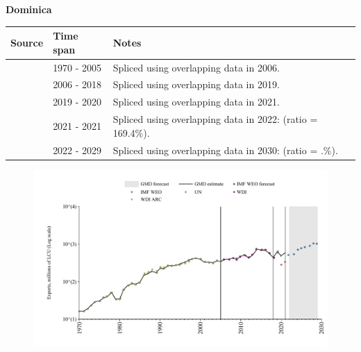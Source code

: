 \documentclass[12pt,a4paper,landscape]{article}
\begin{document}
\begin{adjustbox}{max totalsize={\paperwidth}{\paperheight},center}
\begin{minipage}[t][\textheight][t]{\textwidth}
\vspace*{0.5cm}
{}
\begin{center}
{\Large\bfseries Dominica}
\end{center}
\vspace{0.5cm}
\begin{table}[H]
\centering
\small
\begin{tabular}{|l|l|l|}
\hline
\textbf{Source} & \textbf{Time span} & \textbf{Notes} \\
\hline
\rowcolor{white}\cite{UN}& 1970 - 2005 &Spliced using overlapping data in 2006.\\
\rowcolor{lightgray}\cite{WDI}& 2006 - 2018 &Spliced using overlapping data in 2019.\\
\rowcolor{white}\cite{UN}& 2019 - 2020 &Spliced using overlapping data in 2021.\\
\rowcolor{lightgray}\cite{IMF_WEO}& 2021 - 2021 &Spliced using overlapping data in 2022: (ratio = 169.4\%).\\
\rowcolor{white}\cite{IMF_WEO_forecast}& 2022 - 2029 &Spliced using overlapping data in 2030: (ratio = .\%).\\
\hline
\end{tabular}
\end{table}
\begin{figure}[H]
\centering
\includegraphics[width=\textwidth,height=0.6\textheight,keepaspectratio]{graphs/DMA_exports.pdf}
\end{figure}
\end{minipage}
\end{adjustbox}
\end{document}
